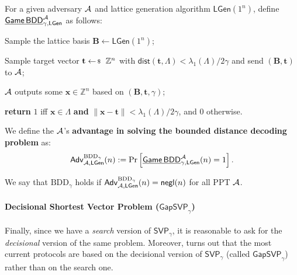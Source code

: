 \documentclass[../../book.tex]{subfiles}
\begin{document}
\begin{definition}\label{def:bdd} For a given adversary $\mathcal{A}$
    and lattice generation algorithm $\mathsf{LGen}(1^{n})$, define
    $\underline{\mathsf{Game}\,\mathsf{BDD}}^{\mathcal{A}}_{\gamma,\mathsf{LGen}}$
    as follows:
    \begin{algoen}
        \item Sample the lattice basis $\mathbf{B} \gets \mathsf{LGen}(1^{n})$;
        \item Sample target vector $\mathbf{t} \leftarrowS \mathbb{Z}^{n}$
        \textcolor{blue!70!purple}{with $\mathsf{dist}(\mathbf{t}, \Lambda) <
        \lambda_1(\Lambda)/2\gamma$} and send $(\mathbf{B},\mathbf{t})$ to $\mathcal{A}$;
        \item $\mathcal{A}$ outputs some $\mathbf{x} \in \mathbb{Z}^{n}$ based on
        $(\mathbf{B},\mathbf{t},\gamma)$;
        \item \textbf{return} $1$ iff \textcolor{blue!70!purple}{$\mathbf{x} \in
        \Lambda$ \textbf{and}
        $\|\mathbf{x}-\mathbf{t}\|<\lambda_1(\Lambda)/2\gamma$}, and $0$
        otherwise.
    \end{algoen}
    We define the $\mathcal{A}$'s \textbf{advantage in solving the bounded
    distance decoding problem} as:
    \begin{equation*}
        \mathsf{Adv}^{\text{BDD}_{\gamma}}_{\mathcal{A},\mathsf{LGen}}(n) := \Pr\left[\underline{\mathsf{Game}\,\mathsf{BDD}}^{\mathcal{A}}_{\gamma,\mathsf{LGen}}(n) = 1\right].
    \end{equation*} 

    We say that $\text{BDD}_{\gamma}$ holds if
    $\mathsf{Adv}^{\text{BDD}_{\gamma}}_{\mathcal{A},\mathsf{LGen}}(n) = \mathsf{negl}(n)$ for all PPT $\mathcal{A}$.
\end{definition}

\paragraph{Decisional Shortest Vector Problem ($\mathsf{GapSVP}_{\gamma}$)}\label{section:gap-cvp}

Finally, since we have a \textit{search} version of $\mathsf{SVP}_{\gamma}$, it is reasonable to ask for the \textit{decisional} version of the same problem.
Moreover, turns out that the most current protocols are based on the decisional version of $\mathsf{SVP}_{\gamma}$ (called $\mathsf{GapSVP}_{\gamma}$) rather than on the search one.
\end{document}
